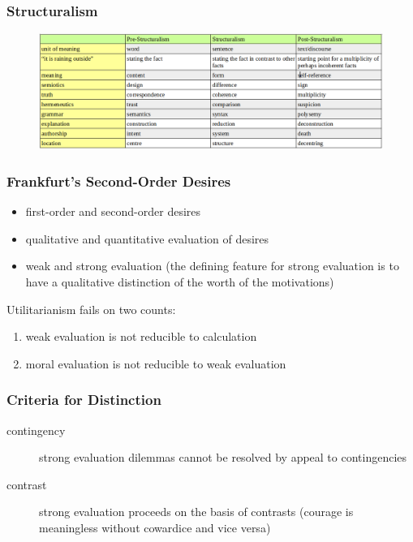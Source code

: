 \documentclass[xcolor=dvipsnames]{beamer}
\begin{document}
\begin{frame}
  \frametitle{Structuralism}
\begin{figure}[h]
\includegraphics[scale=.3]{./structable.png}
\end{figure}
\end{frame}

\begin{frame}
  \frametitle{Frankfurt's Second-Order Desires}
  \begin{itemize}
  \item first-order and second-order desires
  \item qualitative and quantitative evaluation of desires
  \item weak and strong evaluation (the defining feature for strong
    evaluation is to have a qualitative distinction of the worth of
    the motivations)
  \end{itemize}
Utilitarianism fails on two counts:
\begin{enumerate}
\item weak evaluation is not reducible to calculation
\item moral evaluation is not reducible to weak evaluation
\end{enumerate}
\end{frame}

\begin{frame}
  \frametitle{Criteria for Distinction}
  \begin{description}
  \item[contingency] strong evaluation dilemmas cannot be resolved by appeal to contingencies
  \item[contrast] strong evaluation proceeds on the basis of
    contrasts (courage is meaningless without cowardice and vice
    versa)
  \end{description}
\end{frame}
\end{document}
